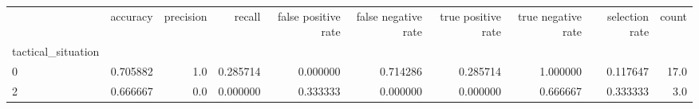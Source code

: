 \begin{tabular}{lrrrrrrrrr}
\toprule
{} &  accuracy &  precision &    recall &  false positive rate &  false negative rate &  true positive rate &  true negative rate &  selection rate &  count \\
tactical\_situation &           &            &           &                      &                      &                     &                     &                 &        \\
\midrule
0                  &  0.705882 &        1.0 &  0.285714 &             0.000000 &             0.714286 &            0.285714 &            1.000000 &        0.117647 &   17.0 \\
2                  &  0.666667 &        0.0 &  0.000000 &             0.333333 &             0.000000 &            0.000000 &            0.666667 &        0.333333 &    3.0 \\
\bottomrule
\end{tabular}
